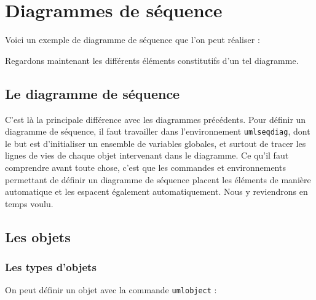 \documentclass[a4paper,11pt]{report}
\newcommand{\inputTikZ}[1]{%
  }%
\newcommand{\inputTikZ}[1]{%
    \texttt{[image: fig/\#1.pdf]}%
  }%
\begin{document}
\begin{center}
\inputTikZ{figure63}
\end{center}

%
\chapter{Diagrammes de séquence}\label{c.seq}

Voici un exemple de diagramme de séquence que l'on peut réaliser :

\begin{center}
\inputTikZ{seqdiagex}
\end{center}

Regardons maintenant les différents éléments constitutifs d'un tel diagramme.

\section{Le diagramme de séquence}\label{s.seqdiag}

C'est là la principale différence avec les diagrammes précédents. Pour définir un diagramme de séquence, il faut travailler dans l'environnement {\tt umlseqdiag}, dont le but est d'initialiser un ensemble de variables globales, et surtout de tracer les lignes de vies de chaque objet intervenant dans le diagramme. Ce qu'il faut comprendre avant toute chose, c'est que les commandes et environnements permettant de définir un diagramme de séquence placent les éléments de manière automatique et les espacent également automatiquement. Nous y reviendrons en temps voulu.

\section{Les objets}\label{s.objs}

\subsection{Les types d'objets}\label{ss.obj}

On peut définir un objet avec la commande {\tt umlobject} :

\medskip

\begin{minipage}{0.5\textwidth}

\end{minipage}
\begin{minipage}{0.5\textwidth}
\begin{center}
\inputTikZ{figure64}
\end{center}
\end{minipage}
\end{document}
